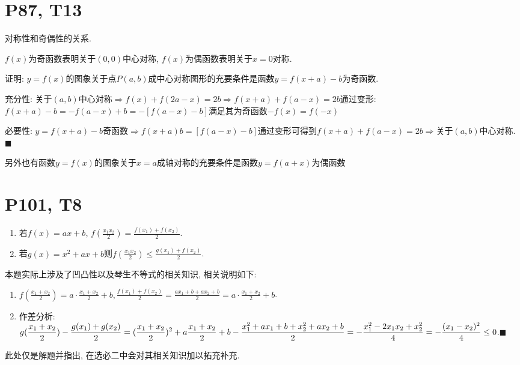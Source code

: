 \documentclass{book}
\begin{document}
    \section{\textcolor[rgb]{0.11,0.65,0.52}{P87, T13}}
    \textcolor[rgb]{0.38,0.11,0.2}{对称性}和\textcolor[rgb]{0.38,0.11,0.2}{奇偶性}的关系.

    $f(x)$为奇函数表明关于$(0,0)$中心对称, $f(x)$为偶函数表明关于$x=0$对称.

    \begin{boxB}
        证明: $y=f(x)$的图象关于点$P(a,b)$成中心对称图形的充要条件是函数$y=f(x+a)-b$为奇函数.
    \end{boxB}

    \textcolor[rgb]{0.75,0.17,0.22}{充分性}:
        关于$(a,b)$中心対称$\Longrightarrow f(x)+f(2a-x)=2b\Longrightarrow f(x+a)+f(a-x)=2b$通过变形:$f(x+a)-b=-f(a-x)+b=-[f(a-x)-b]$满足其为奇函数$-f(x)=f(-x)$

    \textcolor[rgb]{0.75,0.17,0.22}{必要性}:
    $y=f(x+a)-b$奇函数$\Longrightarrow f(x+a)b=[f(a-x)-b]$通过变形可得到$f(x+a)+f(a-x)=2b$$\Longrightarrow$关于$(a,b)$中心对称. $\blacksquare$

    另外也有函数$y=f(x)$的图象关于$x=a$成轴对称的充要条件是函数$y=f(a+x)$为偶函数

    \section{\textcolor[rgb]{0.11,0.65,0.52}{P101, T8}}
    \begin{boxB}
        \begin{enumerate}
            \item 若$f(x)=ax+b$, $\displaystyle f(\frac{x_1x_2}{2})=\frac{f(x_1)+f(x_2)}{2}$.
            \item 若$g(x)=x^2+ax+b$则$\displaystyle f(\frac{x_1x_2}{2})\le \frac{g(x_1)+f(x_2)}{2}$.
        \end{enumerate}
    \end{boxB}
    本题实际上涉及了\textcolor[rgb]{0.38,0.11,0.2}{凹凸性}以及\textcolor[rgb]{0.38,0.11,0.2}{琴生不等式}的相关知识, 相关说明如下:
    \begin{enumerate}
        \doublespacing
        \item $\displaystyle f(\frac{x_1+x_2}{2})=a\cdot \frac{x_1+x_2}{2}+b, \frac{f(x_1)+f(x_2)}{2}=\frac{ax_1+b+ax_2+b}{2}=a\cdot \frac{x_1+x_2}{2}+b$.
        \item \textcolor[rgb]{0.75,0.17,0.22}{作差分析}: $\displaystyle g(\frac{x_1+x_2}{2})-\frac{g(x_1)+g(x_2)}{2}\\=(\frac{x_1+x_2}{2})^2+a\frac{x_1+x_2}{2}+b-\frac{x_1^2+ax_1+b+x_2^2+ax_2+b}{2}\\=-\frac{x_1^2-2x_1x_2+x_2^2}{4}=-\frac{(x_1-x_2)^2}{4}\le 0$.$\blacksquare$
    \end{enumerate}
    此处仅是解题并指出, 在选必二中会对其相关知识加以拓充补充.
\end{document}
